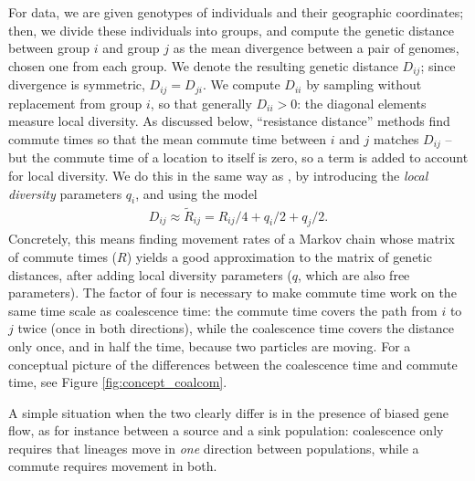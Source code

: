 \documentclass{article}
\newcommand{\comdist}{\widetilde{R}}
\begin{document}
For data, we are given genotypes of individuals and their geographic coordinates;
then, we divide these individuals into groups,
and compute the genetic distance between group $i$ and group $j$
as the mean divergence between a pair of genomes, chosen one from each group.
We denote the resulting genetic distance $D_{ij}$;
since divergence is symmetric, $D_{ij} = D_{ji}$.
We compute $D_{ii}$ by sampling without replacement from group $i$,
so that generally $D_{ii} > 0$: the diagonal elements measure local diversity.
As discussed below, 
``resistance distance'' methods find commute times so that the mean commute time between
$i$ and $j$ matches $D_{ij}$ -- but the commute time of a location to itself is zero,
so a term is added to account for local diversity.
We do this in the same way as \citet{petkova2016visualizing},
by introducing the \emph{local diversity} parameters $q_i$,
and using the model
\begin{align} \label{eq:commute_approx}
	D_{ij} \approx \comdist_{ij} = R_{ij}/4 + q_{i}/2 + q_{j}/2 .
\end{align}
Concretely, this means finding 
movement rates of a Markov chain whose matrix of commute times ($R$)
yields a good approximation to the matrix of genetic distances,
after adding local diversity parameters ($q$, which are also free parameters). 
The factor of four is necessary to make commute time work on the same time scale as coalescence time:
the commute time covers the path from $i$ to $j$ twice
(once in both directions),
while the coalescence time covers the distance only once,
and in half the time, because two particles are moving.
For a conceptual picture of the differences between the coalescence time and commute time,
see Figure \ref{fig:concept_coalcom}. 

A simple situation when the two clearly differ 
is in the presence of biased gene flow,
as for instance between a source and a sink population:
coalescence only requires that lineages move in \emph{one} direction
between populations,
while a commute requires movement in both.
\end{document}
